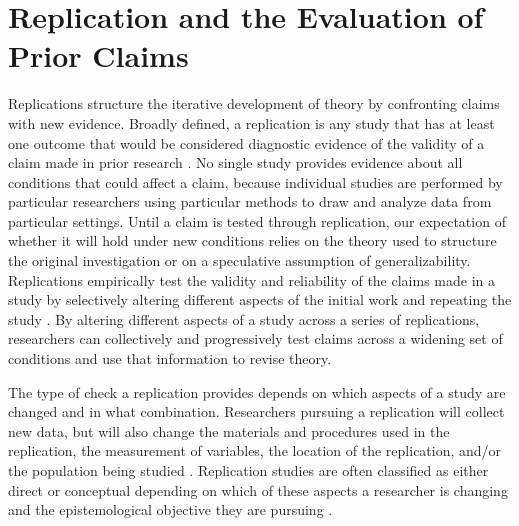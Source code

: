 \documentclass[]{interact}
\theoremstyle{plain}%
\theoremstyle{definition}
\theoremstyle{remark}
\begin{document}
\section*{Replication and the Evaluation of Prior Claims}
Replications structure the iterative development of theory by confronting claims with new evidence.
Broadly defined, a replication is any study that has at least one outcome that would be considered diagnostic evidence of the validity of a claim made in prior research \citep{nosek2020}.
No single study provides evidence about all conditions that could affect a claim, because individual studies are performed by particular researchers using particular methods to draw and analyze data from particular settings. 
Until a claim is tested through replication, our expectation of whether it will hold under new conditions relies on the theory used to structure the original investigation or on a speculative assumption of generalizability.
Replications empirically test the validity and reliability of the claims made in a study by selectively altering different aspects of the initial work and repeating the study \citep{schmidt2009, gomez2010replications, radder2003, radder2012}.  
By altering different aspects of a study across a series of replications, researchers can collectively and progressively test claims across a widening set of conditions and use that information to revise theory.

The type of check a replication provides depends on which aspects of a study are changed and in what combination. 
Researchers pursuing a replication will collect new data, but will also change the materials and procedures used in the replication, the measurement of variables, the location of the replication, and/or the population being studied \citep{hendrick1990, schmidt2009, gomez2010replications}. 
Replication studies are often classified as either direct or conceptual depending on which of these aspects a researcher is changing and the epistemological objective they are pursuing \citep[see][]{sargent1981repeatability, schmidt2009, plesser2018reproducibility}.
\end{document}
